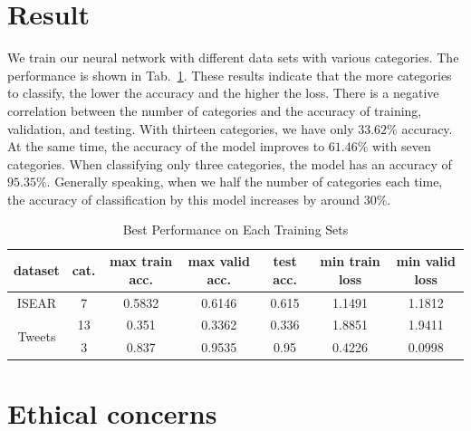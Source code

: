 \documentclass[11pt,a4paper,man,floatsintext]{apa6}
\begin{document}
\section{Result}

We train our neural network with different data sets with various categories. The performance is shown in Tab.~\ref{perform}. These results indicate that the more categories to classify, the lower the accuracy and the higher the loss. There is a negative correlation between the number of categories and the accuracy of training, validation, and testing. With thirteen categories, we have only $33.62\%$ accuracy. At the same time, the accuracy of the model improves to $61.46\%$ with seven categories. When classifying only three categories, the model has an accuracy of $95.35\%$. Generally speaking, when we half the number of categories each time, the accuracy of classification by this model increases by around $30\%$.

\begin{table}[ht]
 \caption{Best Performance on Each Training Sets\label{perform}}
\centering
\begin{tabular}{|c|c|c|c|c|c|c|}
\hline
dataset & cat. & max train acc. & max valid acc. & test acc. & min train loss & min valid loss \\ \hline
ISEAR & 7 & 0.5832 & 0.6146 & 0.615 & 1.1491 & 1.1812 \\ \hline
\multirow{2}{*}{Tweets} & 13 & 0.351 & 0.3362 & 0.336 & 1.8851 & 1.9411 \\ \cline{2-7} 
 & 3 & 0.837 & 0.9535 & 0.95 & 0.4226 & 0.0998 \\ \hline
\end{tabular}
\end{table}



\section{Ethical concerns}
\end{document}
